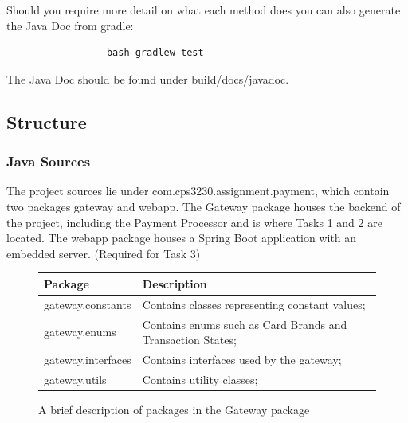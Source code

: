 \documentclass[11pt, a4paper]{article}
\begin{document}
    Should you require more detail on what each method does you can also generate the Java Doc from gradle:
    \begin{figure}[H]
        \centering
        \begin{verbatim}
            bash gradlew test
        \end{verbatim}
    \end{figure}
    The Java Doc should be found under build/docs/javadoc.

    \subsection{Structure}
        \subsubsection{Java Sources}
            The project sources lie under com.cps3230.assignment.payment, which contain two packages gateway and webapp. The Gateway package houses the backend of the project, including the Payment Processor and is where Tasks 1 and 2 are located. The webapp package houses a Spring Boot application with an embedded server. (Required for Task 3)
            \begin{figure}[H]
                \centering
                \begin{tabular} { p{4.5cm} | p{4.5cm} }
                    Package & Description \\
                    \hline
                    gateway.constants & Contains classes representing constant values; \\
                    gateway.enums & Contains enums such as Card Brands and Transaction States; \\
                    gateway.interfaces & Contains interfaces used by the gateway; \\
                    gateway.utils & Contains utility classes; \\
                \end{tabular}
                \caption{A brief description of packages in the Gateway package}
            \end{figure}
\end{document}
